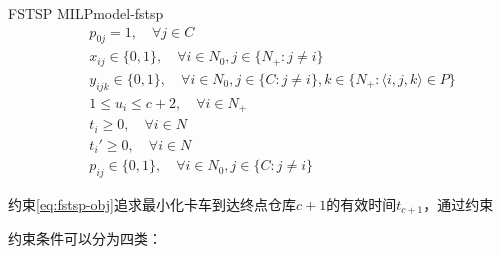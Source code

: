 {\begin{model}{FSTSP MILP}{model-fstsp}
\begin{align}
    \quad & p_{0j} = 1, \quad \forall j \in C\label{eq:fstsp-drone-start-order}\\
    \quad & x_{ij} \in \{0, 1\}, \quad \forall i \in N_0, j \in \{N_{+}:j \neq i\}\label{eq:fstsp-x-bound}\\
    \quad & y_{ijk} \in \{0, 1\}, \quad \forall i \in N_0, j \in \{C:j \neq i\}, k \in \{N_{+}:\langle i,j,k \rangle \in P\}\label{eq:fstsp-y-bound}\\
    \quad & 1 \leq u_i \leq c+2, \quad \forall i \in N_{+}\label{eq:fstsp-u-bound}\\
    \quad & t_i \geq 0, \quad \forall i \in N\label{eq:fstsp-truck-time-bound}\\
    \quad & t_i' \geq 0, \quad \forall i \in N\label{eq:fstsp-drone-time-bound}\\
    \quad & p_{ij}\in \{0, 1\}, \quad \forall i \in N_0, j \in \{C: j \neq i\}\label{eq:fstsp-drone-order-bound}
\end{align}
\end{model}
}

约束\ref{eq:fstsp-obj}追求最小化卡车到达终点仓库$c+1$的有效时间$t_{c+1}$，通过约束

约束条件可以分为四类\cite{zhihu-murray2015}：

